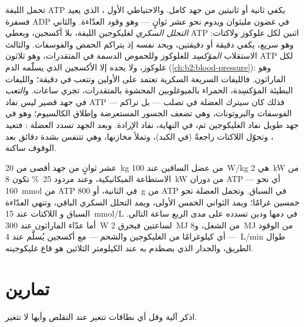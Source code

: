 \begin{proposition}\label{prop:b2:muscle-movement:energy}
تحمل الليفة ATP يكفي ثانية أو ثانيتين من جهد كامل. والاحتياطي
الأول \emph{}، الذي يعيد فسفرة ADP
في غضون مليثوان ويدوم نحو عشر ثوانٍ --- وهو وقود العدّاءة.
والثاني \emph{التحلل السكري} لغليكوجين الليفة،
بلا أكسجين، ويعطي ATP اثنين لكل غلوكوز ولاكتات: وهو سريع،
يكفي دقيقة أو دقيقتين، ويحد نفسه إذ يتراكم الحمض والفوسفات.
والثالث الاستقلاب \emph{المؤكسِد} للغلوكوز
وللحموض الدسمة في المتقدرات، وهو ثلاثون ATP لكل غلوكوز، ولا يحده
إلا الأكسجين الذي يسلّمه الدم
(\cref{ch:b2:blood-pressure}): وهو الماراثون. فالليفات السريعة السكرية
تعتمد على الأولين وتتعب في دقيقة؛ والليفات البطيئة المؤكسِدة،
الحمراء بالميوغلوبين المحشوة بالمتقدرات، تجري ساعات.
و\emph{التعب} في جهد قصير ليس نفاد ATP ---
فذلك كان سيترك العضلة في تصلب --- بل تراكم
الفوسفات والبروتونات، وهي تضعف الجسور المستعرضة وإطلاق
الكالسيوم؛ وهو في جهد طويل نفاد الغليكوجين
ثم، في النهاية، نفاد الإرادة. وبعد الجهد تسدد العضلة
\emph{}: فتعيد ، وتحوّل
اللاكتات راجعةً (في الكبد)، وتملأ مخازنها، وهي تتنفس
بشدة دقائق بعد الوقوف ساكنة.
\end{proposition}

\begin{example}\label{ex:b2:muscle-movement:sprint}
عشر ثوانٍ من جهد أقصى من \qty{20}{kg} من عضل الساقين عند
\qty{100}{W/kg} هي \qty{2}{kW} من الاستطاعة الميكانيكية، وعند
مردود \qty{25}{\%} تكون \qty{8}{kW} من دوران ATP --- أي نحو
\qty{160}{mmol} من ATP في الثانية، أو \qty{800}{g} من ATP في السباق.
وتحمل العضلة نحو خمسين غرامًا؛ ويمد  الثواني الخمس
الأولى، ويمد التحلل السكري الباقي، وتنهي العدّاءة السباق و
اللاكتات عند \qty{15}{mmol/L} في دمها ودين تسدده على مدى
الربع ساعة التالي. أما عدّاء الماراثون عند \qty{300}{W} لساعتين
فيحرق \qty{2}{MJ} من الشغل، و\qty{8}{MJ} من الوقود --- أي كيلوغرامًا من
الغليكوجين والشحم --- مع أكسجين يُسلَّم عند \qty{4}{L/min} طوال
الطريق، والجدار الذي يصطدم به عند الكيلومتر الثلاثين هو قاع
غليكوجينه.
\end{example}

\section{تمارين}

\begin{exercise}[$\star$]\label{exo:b2:muscle-movement:1}
اذكر آلية  وقل أي نطاقات
 تتغير عند التقلص وأيها لا تتغير.
\end{exercise}

